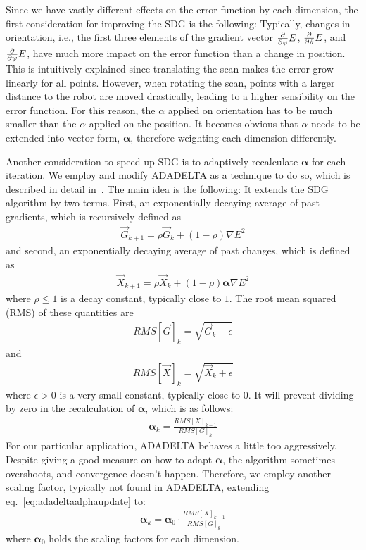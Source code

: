 Since we have vastly different effects on the error function by each dimension, the first consideration for improving the SDG is the following:
Typically, changes in orientation, i.e., the first three elements of the gradient vector $\frac{\partial}{\partial \varphi}E$, $\frac{\partial}{\partial \vartheta}E$, and $\frac{\partial}{\partial \psi}E$, have much more impact on the error function than a change in position.
This is intuitively explained since translating the scan makes the error grow linearly for all points.
However, when rotating the scan, points with a larger distance to the robot are moved drastically, leading to a higher sensibility on the error function.
For this reason, the $\alpha$ applied on orientation has to be much smaller than the $\alpha$ applied on the position.
It becomes obvious that $\alpha$ needs to be extended into vector form, $\boldsymbol\alpha$, therefore weighting each dimension differently.

Another consideration to speed up SDG is to adaptively recalculate $\boldsymbol\alpha$ for each iteration. 
We employ and modify ADADELTA as a technique to do so, which is described in detail in~\cite{zeiler2012adadelta}.
The main idea is the following:
It extends the SDG algorithm by two terms.
First, an exponentially decaying average of past gradients, which is recursively defined as
\begin{align}
    \vec{G}_{k+1} = \rho \vec{G}_{k} + (1 - \rho) {\nabla E}^2
\end{align}
and second, an exponentially decaying average of past changes, which is defined as
\begin{align}
    \vec{X}_{k+1} = \rho \vec{X}_{k} + (1 - \rho) {\boldsymbol\alpha \nabla E}^2
\end{align}
where $\rho \leq 1$ is a decay constant, typically close to $1$.
The root mean squared (RMS) of these quantities are
\begin{align}
    RMS[\vec{G}]_{k} = \sqrt{\vec{G}_{k} + \epsilon}
\end{align}
and 
\begin{align}
    RMS[\vec{X}]_{k} = \sqrt{\vec{X}_{k} + \epsilon}
\end{align}
where $\epsilon > 0$ is a very small constant, typically close to $0$.
It will prevent dividing by zero in the recalculation of $\boldsymbol\alpha$, which is as follows:
\begin{align}
    \boldsymbol\alpha_{k} = \frac{RMS[X]_{k-1}}{RMS[G]_{k}}
    \label{eq:adadeltaalphaupdate}
\end{align} 
For our particular application, ADADELTA behaves a little too aggressively.
Despite giving a good measure on how to adapt $\boldsymbol\alpha$, the algorithm sometimes overshoots, and convergence doesn't happen.
Therefore, we employ another scaling factor, typically not found in ADADELTA, extending eq.~\eqref{eq:adadeltaalphaupdate} to:
\begin{align}
    \boldsymbol\alpha_{k} = \boldsymbol\alpha_0 \cdot \frac{RMS[X]_{k-1}}{RMS[G]_{k}}
    \label{eq:adafinalized}
\end{align} 
where $\boldsymbol\alpha_0 $ holds the scaling factors for each dimension.

